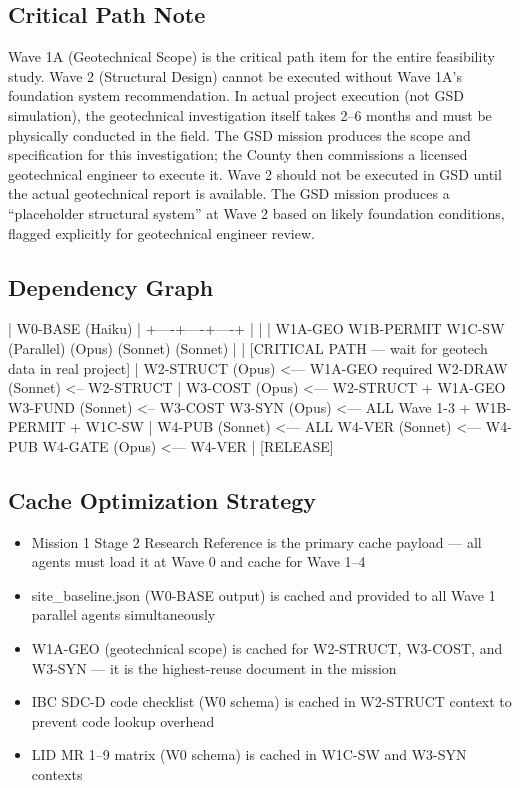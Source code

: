 \documentclass[11pt,letterpaper]{article}
\begin{document}
\subsection{Critical Path Note}

Wave 1A (Geotechnical Scope) is the critical path item for the entire feasibility study. Wave 2 (Structural Design) cannot be executed without Wave 1A's foundation system recommendation. In actual project execution (not GSD simulation), the geotechnical investigation itself takes 2--6 months and must be physically conducted in the field. The GSD mission produces the scope and specification for this investigation; the County then commissions a licensed geotechnical engineer to execute it. Wave 2 should not be executed in GSD until the actual geotechnical report is available. The GSD mission produces a ``placeholder structural system'' at Wave 2 based on likely foundation conditions, flagged explicitly for geotechnical engineer review.

\subsection{Dependency Graph}

\begin{asciibox}
        |
   W0-BASE (Haiku)
        |
   +----+----+----+
   |         |    |
W1A-GEO  W1B-PERMIT  W1C-SW  (Parallel)
(Opus)   (Sonnet)   (Sonnet)
   |
   | [CRITICAL PATH — wait for geotech data in real project]
   |
W2-STRUCT (Opus) <--- W1A-GEO required
W2-DRAW   (Sonnet) <-- W2-STRUCT
   |
W3-COST (Opus) <--- W2-STRUCT + W1A-GEO
W3-FUND (Sonnet) <-- W3-COST
W3-SYN  (Opus)  <--- ALL Wave 1-3 + W1B-PERMIT + W1C-SW
   |
W4-PUB  (Sonnet) <--- ALL
W4-VER  (Sonnet) <--- W4-PUB
W4-GATE (Opus)   <--- W4-VER
   |
[RELEASE]
\end{asciibox}

\subsection{Cache Optimization Strategy}

\begin{itemize}
  \item Mission 1 Stage 2 Research Reference is the primary cache payload --- all agents must load it at Wave 0 and cache for Wave 1--4
  \item site\_baseline.json (W0-BASE output) is cached and provided to all Wave 1 parallel agents simultaneously
  \item W1A-GEO (geotechnical scope) is cached for W2-STRUCT, W3-COST, and W3-SYN --- it is the highest-reuse document in the mission
  \item IBC SDC-D code checklist (W0 schema) is cached in W2-STRUCT context to prevent code lookup overhead
  \item LID MR 1--9 matrix (W0 schema) is cached in W1C-SW and W3-SYN contexts
\end{itemize}
\end{document}
